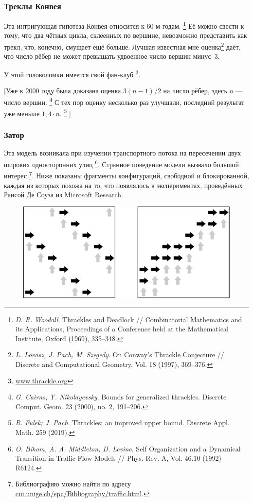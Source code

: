 \documentclass[twoside]{book}
\begin{document}
\subsubsection*{Треклы Конвея}

Эта интригующая гипотеза Конвея относится к 60-м годам.%
\footnote{\emph{D. R. Woodall}. Thrackles and Deadlock /\!/ {Combinatorial Mathematics and its Appli\-ca\-tions}, Proceedings of a Conference held at the Mathematical Institute, Oxford (1969), 335--348.}
Её можно свести к тому, что два чётных цикла, склеенных по вершине, невозможно представить как трекл,
что, конечно, смущает ещё больше.
Лучшая известная мне оценка\footnote{\emph{L. Lovasz, J. Pach, M. Szegedy}. On Conway's Thrackle Conjecture /\!/ {Discrete and Compu\-ta\-tional Geometry}, Vol. 18 (1997), 369--376.} даёт, что число рёбер не может превышать удвоенное число вершин минус~3.%

У этой головоломки имеется свой фан-клуб%
\footnote{\href{http://www.thrackle.org}{\url{www.thrackle.org}}}.

[Уже к 2000 году была доказана оценка $3(n-1)/2$ на число рёбер, здесь $n$ --- число вершин.%
\footnote{\emph{G. Cairns, Y. Nikolayevsky}.
Bounds for generalized thrackles.
Discrete Comput. Geom. 23 (2000), no. 2, 191--206.}
С тех пор оценку несколько раз улучшали, последний результат уже меньше $1{,}4\cdot n$.%
\footnote{\emph{R. Fulek; J. Pach}. Thrackles: an improved upper bound. Discrete Appl. Math. 259 (2019).}%
]

\subsubsection*{Затор}

Эта модель возникала при изучении транспортного потока на пересечении двух широких односторонних улиц%
\footnote{\emph{O. Biham, A. A. Middleton, D. Levine}. Self Organization and a Dynamical Transition in Traffic Flow Models /\!/ {Phys. Rev. A}, Vol. 46.10 (1992) R6124.}.
Странное поведение модели вызвало большой интерес%
\footnote{Библиографию можно найти по адресу \href{http://cui.unige.ch/spc/Bibliography/traffic.html.}{\url{cui.unige.ch/spc/Bibliography/traffic.html}}.}.
Ниже показаны фрагменты конфигураций, свободной и блокированной, каждая из которых похожа на то, что появлялось в экспериментах, проведённых Раисой Де Соуза из Microsoft Research.

\begin{figure}[!ht]
\centering
\includegraphics{mp/wink-32}
\end{figure}
\end{document}
